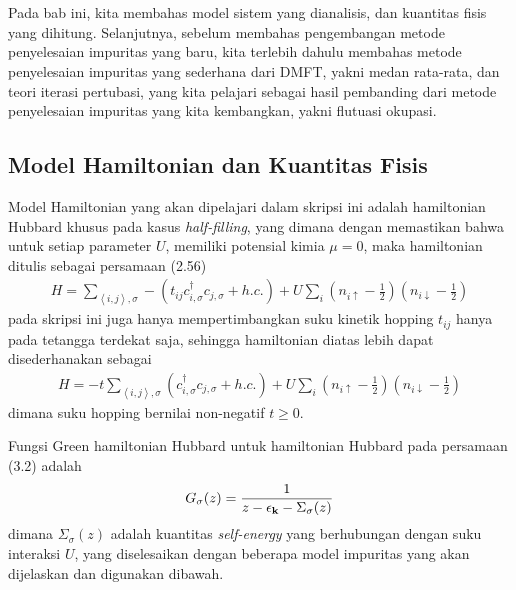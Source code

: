 \chapter{\babTiga}

Pada bab ini, kita membahas model sistem yang dianalisis, dan kuantitas fisis yang dihitung. Selanjutnya, sebelum membahas pengembangan metode penyelesaian impuritas yang baru, kita terlebih dahulu membahas metode penyelesaian impuritas yang sederhana dari DMFT, yakni medan rata-rata, dan teori iterasi pertubasi, yang kita pelajari sebagai hasil pembanding dari metode penyelesaian impuritas yang kita kembangkan, yakni flutuasi okupasi.

\section{Model Hamiltonian dan Kuantitas Fisis}

Model Hamiltonian yang akan dipelajari dalam skripsi ini adalah hamiltonian Hubbard khusus pada kasus \textit{half-filling}, yang dimana dengan memastikan bahwa untuk setiap parameter $U$, memiliki potensial kimia $\mu = 0$, maka hamiltonian ditulis sebagai persamaan (2.56)
\begin{align}
H = \sum_{\left< i,j \right> , \sigma} -\left(t_{ij} c^\dagger_{i,\sigma}c_{j,\sigma} + h.c. \right) + U \sum_i \left( n_{i\uparrow} - \frac{1}{2}\right) \left(n_{i\downarrow} - \frac{1}{2} \right)
\end{align}
pada skripsi ini juga hanya mempertimbangkan suku kinetik hopping $t_{ij}$ hanya pada tetangga terdekat saja, sehingga hamiltonian diatas lebih dapat disederhanakan sebagai
\begin{align}
H = -t\sum_{\left< i,j \right> , \sigma} \left( c^\dagger_{i,\sigma}c_{j,\sigma} + h.c. \right) + U \sum_i \left( n_{i\uparrow} - \frac{1}{2}\right) \left(n_{i\downarrow} - \frac{1}{2} \right)
\end{align}
dimana suku hopping bernilai non-negatif $t \geq 0$. 

Fungsi Green hamiltonian Hubbard untuk hamiltonian Hubbard pada persamaan (3.2) adalah
\begin{align}
G_\sigma(z) = \frac{1}{z - \epsilon_{\textbf{k}} - \Sigma_\sigma(z)}
\end{align}
dimana $\Sigma_\sigma(z)$ adalah kuantitas \textit{self-energy} yang berhubungan dengan suku interaksi $U$, yang diselesaikan dengan beberapa model impuritas yang akan dijelaskan dan digunakan dibawah.

